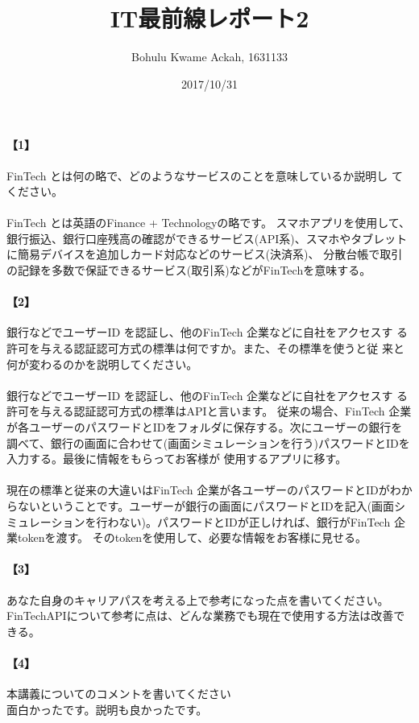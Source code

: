 \documentclass[20 pts]{article}
\title{IT最前線レポート2}
\author{Bohulu Kwame Ackah, 1631133}
\date{2017/10/31}
\begin{document}
\maketitle

\newpage
\paragraph{【1】}FinTech とは何の略で、どのようなサービスのことを意味しているか説明し
てください。
\paragraph{}
FinTech とは英語のFinance + Technologyの略です。
スマホアプリを使用して、銀行振込、銀行口座残高の確認ができるサービス(API系)、スマホやタブレットに簡易デバイスを追加しカード対応などのサービス(決済系)、
分散台帳で取引の記録を多数で保証できるサービス(取引系)などがFinTechを意味する。

\paragraph{【2】}銀行などでユーザーID を認証し、他のFinTech 企業などに自社をアクセスす
る許可を与える認証認可方式の標準は何ですか。また、その標準を使うと従
来と何が変わるのかを説明してください。\\

\paragraph{}
銀行などでユーザーID を認証し、他のFinTech 企業などに自社をアクセスす
る許可を与える認証認可方式の標準はAPIと言います。
従来の場合、FinTech 企業が各ユーザーのパスワードとIDをフォルダに保存する。次にユーザーの銀行を調べて、銀行の画面に合わせて(画面シミュレーションを行う)パスワードとIDを入力する。最後に情報をもらってお客様が
使用するアプリに移す。
\paragraph{}
現在の標準と従来の大違いはFinTech 企業が各ユーザーのパスワードとIDがわからないということです。ユーザーが銀行の画面にパスワードとIDを記入(画面シミュレーションを行わない)。パスワードとIDが正しければ、銀行がFinTech 企業tokenを渡す。
そのtokenを使用して、必要な情報をお客様に見せる。



\newpage
\paragraph{【3】}あなた自身のキャリアパスを考える上で参考になった点を書いてください。\\
FinTechAPIについて参考に点は、どんな業務でも現在で使用する方法は改善できる。


\paragraph{【4】}本講義についてのコメントを書いてください\\
面白かったです。説明も良かったです。
\end{document}
